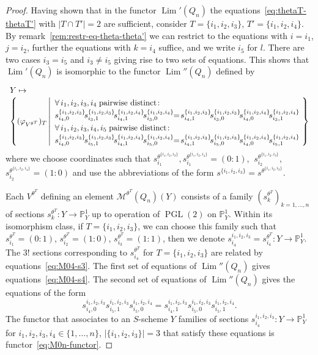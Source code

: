 \documentclass[ALCO,ThmDefs,Unicode,epreuves]{cedram}
\def\phi{\varphi}
\def\P{\mathds P}
\DeclareMathOperator{\PGL}{PGL}
\DeclareMathOperator{\Lim}{Lim}
\begin{document}
\begin{proof}
Having shown that in the functor $\Lim'(Q_n)$ the equations~\eqref{eq:thetaT-thetaT'}
with $|T\cap T'|=2$ are sufficient, consider $T=\{i_1,i_2,i_3\}$, $T'=\{i_1,i_2,i_4\}$.
By remark~\ref{rem:restr-eq-theta-theta'} we can restrict to the equations with 
$i=i_1$, $j=i_2$, further the equations with $k=i_4$ suffice, and we write $i_5$ for $l$. 
There are two cases $i_3=i_5$ and $i_3\neq i_5$ giving rise to two sets of equations. 
This shows that $\Lim'(Q_n)$ is isomorphic to the functor $\Lim''(Q_n)$ defined by 
\[\textstyle
\begin{array}{l}
Y\mapsto\\
\left\{
(\phi_{V^{\theta^T}})_T
\left|
{\renewcommand{\arraystretch}{1.3}
\begin{array}{l}
\forall\,i_1,i_2,i_3,i_4\;\text{pairwise distinct}\colon\\
s^{\{i_1,i_2,i_3\}}_{i_4,0}\!s^{\{i_1,i_2,i_3\}}_{i_3,1}\!
s^{\{i_1,i_2,i_4\}}_{i_4,1}\!s^{\{i_1,i_2,i_4\}}_{i_3,0}
\!\!=\!s^{\{i_1,i_2,i_3\}}_{i_4,1}\!s^{\{i_1,i_2,i_3\}}_{i_3,0}\!
s^{\{i_1,i_2,i_4\}}_{i_4,0}\!s^{\{i_1,i_2,i_4\}}_{i_3,1}\\
\forall\,i_1,i_2,i_3,i_4,i_5\;\text{pairwise distinct}\colon\\
s^{\{i_1,i_2,i_3\}}_{i_4,0}\!s^{\{i_1,i_2,i_3\}}_{i_5,1}\!
s^{\{i_1,i_2,i_4\}}_{i_4,1}\!s^{\{i_1,i_2,i_4\}}_{i_5,0}
\!\!=\!s^{\{i_1,i_2,i_3\}}_{i_4,1}\!s^{\{i_1,i_2,i_3\}}_{i_5,0}\!
s^{\{i_1,i_2,i_4\}}_{i_4,0}\!s^{\{i_1,i_2,i_4\}}_{i_5,1}
\end{array}}
\!\!
\right.\right\}
\end{array}
\]
where we choose coordinates such that 
$s^{\theta^{\{i_1,i_2,i_3\}}}_{i_1}\!,s^{\theta^{\{i_1,i_2,i_4\}}}_{i_1}\!=(0:1)$,
$\:s^{\theta^{\{i_1,i_2,i_3\}}}_{i_2}\!,$ %
$s^{\theta^{\{i_1,i_2,i_4\}}}_{i_2}=(1:0)$ 
and use the abbreviations of the form
$s^{\{i_1,i_2,i_3\}}\!=s^{\theta^{\{i_1,i_2,i_3\}}}$.

Each $V^{\theta^T}$ defining an element $\mathcal M^{\theta^T}(Q_n)(Y)$ consists 
of a family $(s^{\theta^T}_k)_{k=1,\ldots,n}$ of sections $s^{\theta^T}_k\colon Y\to\P^1_Y$
up to operation of $\PGL(2)$ on $\P^1_Y$.
Within its isomorphism class, if $T=\{i_1,i_2,i_3\}$, we can choose this family such that 
$s^{\theta^T}_{i_1}\!=(0:1)$, $s^{\theta^T}_{i_2}\!=(1:0)$, $s^{\theta^T}_{i_3}\!=(1:1)$, 
then we denote $s^{i_1,i_2,i_3}_{i_4}=s^{\theta^T}_{i_4}\colon Y\to\P^1_Y$. 
The $3!$ sections corresponding to $s^{\theta^T}_{i_4}$ for $T=\{i_1,i_2,i_3\}$ 
are related by equations~\eqref{eq:M04-s3}.
The first set of equations of $\Lim''(Q_n)$ gives equations~\eqref{eq:M04-s4}.
The second set of equations of $\Lim''(Q_n)$ gives the equations of the form
\[
s^{i_1,i_2,i_3}_{i_4,0}s^{i_1,i_2,i_3}_{i_5,1}s^{i_1,i_2,i_4}_{i_5,0}
=s^{i_1,i_2,i_3}_{i_4,1}s^{i_1,i_2,i_3}_{i_5,0}s^{i_1,i_2,i_4}_{i_5,1}.
\]
The functor that associates to an $S$-scheme $Y$ families of sections 
$s^{i_1,i_2,i_3}_{i_4}\colon Y\to\P^1_Y$ for $i_1,i_2,i_3,i_4\in\{1,\ldots,n\}$,
$|\{i_1,i_2,i_3\}|=3$ that satisfy these equations is functor~\eqref{eq:M0n-functor}.
\end{proof}
\end{document}

